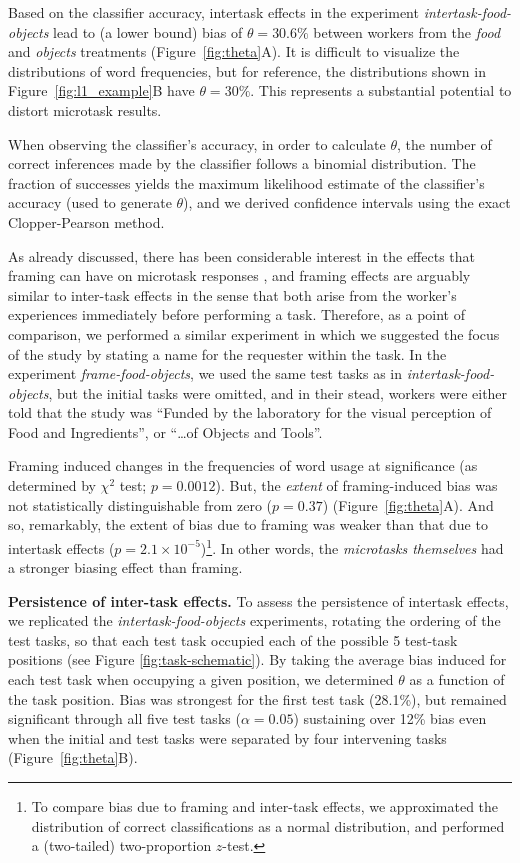 \documentclass{sigchi}
\begin{document}
Based on the classifier accuracy, intertask effects in the 
experiment \textit{intertask-food-objects}
lead to (a lower bound) bias of $\theta=30.6\%$ between workers from the 
\textit{food} and \textit{objects} treatments (Figure~\ref{fig:theta}A).
It is difficult to visualize the distributions of word frequencies,
but for reference, the distributions shown in 
Figure~\ref{fig:l1_example}B have $\theta = 30\%$.  This represents a 
substantial potential to distort microtask results.

When observing the classifier's accuracy, in order to calculate $\theta$,
the number of correct inferences made by the classifier follows a binomial 
distribution.  The fraction of successes yields the maximum likelihood
estimate of the classifier's accuracy (used to generate $\theta$), 
and we derived confidence intervals using the exact Clopper-Pearson method.

As already discussed, there has been considerable interest in the 
effects that framing can have on microtask responses
\cite{Kinnaird2012281,chandler2013breaking,thibodeau2013natural}, and 
framing effects are arguably similar to inter-task effects in the sense 
that both arise from the worker's experiences immediately before 
performing a task.
Therefore, as a point of comparison, we performed a similar experiment 
in which we suggested the focus of the study by stating a name for
the requester within the task.
In the experiment 
\textit{frame-food-objects}, we used the same test tasks as in 
\textit{intertask-food-objects}, but the initial tasks were omitted, 
and in their stead, workers were either told that the study was 
``Funded by the laboratory for the 
visual perception of Food and Ingredients'', 
or ``\ldots of Objects and Tools''.  

Framing induced changes in the frequencies of 
word usage at significance 
(as determined by $\chi^2$ test; $p=0.0012$).  But, 
the \textit{extent} of framing-induced bias was not statistically 
distinguishable from zero ($p =0.37$) (Figure~\ref{fig:theta}A).
And so, remarkably, the extent of bias due to framing was weaker than that 
due to intertask effects ($p=2.1\times 10^{-5}$)\footnote{To compare bias
  due to framing and inter-task effects, we approximated the distribution
  of correct classifications as a normal distribution, and performed
a (two-tailed) two-proportion $z$-test.}.
In other words, the \textit{microtasks themselves}
had a stronger biasing effect than framing.

{\bf Persistence of inter-task effects.} To assess the persistence of intertask effects, we replicated the 
\textit{intertask-food-objects} experiments, rotating the ordering of the
test tasks, so that each test task occupied each of the possible 5 
test-task positions (see Figure \ref{fig:task-schematic}).  
By taking the average bias induced for each test task when 
occupying a given position, we determined $\theta$ as a function of the 
task position.
Bias was strongest for the first test task (28.1\%), 
but remained significant through all five test tasks 
($\alpha=0.05$) sustaining over 12\% bias even when the initial and test 
tasks were separated by four intervening tasks (Figure~\ref{fig:theta}B).
\end{document}
